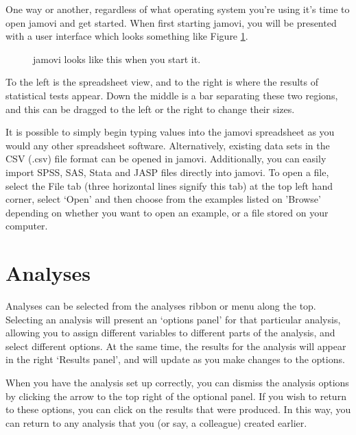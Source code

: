 
One way or another, regardless of what operating system you're using it's time to open jamovi and get started. When first starting jamovi, you will be presented with a user interface which looks something like Figure  \ref{fig:startingjamovi}.

\begin{figure}[ht]
\begin{center}
\caption{jamovi looks like this when you start it.}
\label{fig:startingjamovi}
\end{center}
\end{figure}

To the left is the spreadsheet view, and to the right is where the results of statistical tests appear. Down the middle is a bar separating these two regions, and this can be dragged to the left or the right to change their sizes. 

It is possible to simply begin typing values into the jamovi spreadsheet as you would any other spreadsheet software. Alternatively, existing data sets in the CSV (.csv) file format can be opened in jamovi. Additionally, you can easily import SPSS, SAS, Stata and JASP files directly into jamovi. To open a file, select the File tab (three horizontal lines signify this tab) at the top left hand corner, select ‘Open’ and then choose from the examples listed on 'Browse' depending on whether you want to open an example, or a file stored on your computer.


\section{Analyses\label{sec:analyses}}

Analyses can be selected from the analyses ribbon or menu along the top. Selecting an analysis will present an ‘options panel’ for that particular analysis, allowing you to assign different variables to different parts of the analysis, and select different options. At the same time, the results for the analysis will appear in the right ‘Results panel’, and will update as you make changes to the options.

When you have the analysis set up correctly, you can dismiss the analysis options by clicking the arrow to the top right of the optional panel. If you wish to return to these options, you can click on the results that were produced. In this way, you can return to any analysis that you (or say, a colleague) created earlier.

